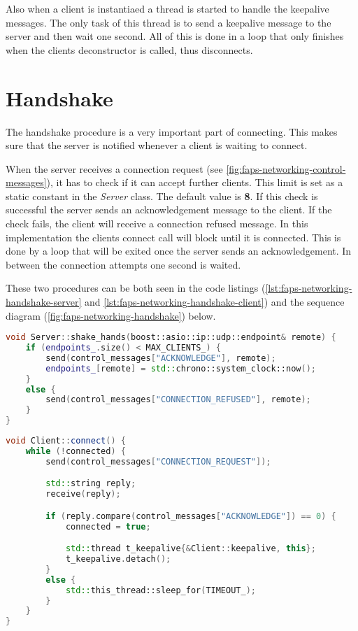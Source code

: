 Also when a client is instantiaed a thread is started to handle the keepalive messages. The only task of this thread is to send a keepalive message to the server and then wait one second. All of this is done in a loop that
only finishes when the clients deconstructor is called, thus disconnects.

\section {Handshake}

The handshake procedure is a very important part of connecting. This makes sure that the server is notified whenever a client is waiting to connect.

When the server receives a connection request (see \ref{fig:faps-networking-control-messages}), it has to check if it can accept further clients. This limit is set as a static constant in the \textit{Server} class. The
default value is \textbf{8}. If this check is successful the server sends an acknowledgement message to the client. If the check fails, the client will receive a connection refused message. In this implementation the
clients connect call will block until it is connected. This is done by a loop that will be exited once the server sends an acknowledgement. In between the connection attempts one second is waited.

These two procedures can be both seen in the code listings (\ref{lst:faps-networking-handshake-server} and \ref{lst:faps-networking-handshake-client}) and the sequence diagram (\ref{fig:faps-networking-handshake}) below.

\begin{minipage}{\linewidth}
\begin{lstlisting}[caption={Server handshake method}, label=lst:faps-networking-handshake-server, captionpos=b, language=C++]
void Server::shake_hands(boost::asio::ip::udp::endpoint& remote) {
    if (endpoints_.size() < MAX_CLIENTS_) {
        send(control_messages["ACKNOWLEDGE"], remote);
        endpoints_[remote] = std::chrono::system_clock::now();
    }
    else {
        send(control_messages["CONNECTION_REFUSED"], remote);
    }
}
\end{lstlisting}
\end{minipage}

\begin{minipage}{\linewidth}
\begin{lstlisting}[caption={Client handshake method}, label=lst:faps-networking-handshake-client, captionpos=b, language=C++]
void Client::connect() {
    while (!connected) {
        send(control_messages["CONNECTION_REQUEST"]);

        std::string reply;
        receive(reply);

        if (reply.compare(control_messages["ACKNOWLEDGE"]) == 0) {
            connected = true;

            std::thread t_keepalive{&Client::keepalive, this};
            t_keepalive.detach();
        }
        else {
            std::this_thread::sleep_for(TIMEOUT_);
        }
    }
}
\end{lstlisting}
\end{minipage}

